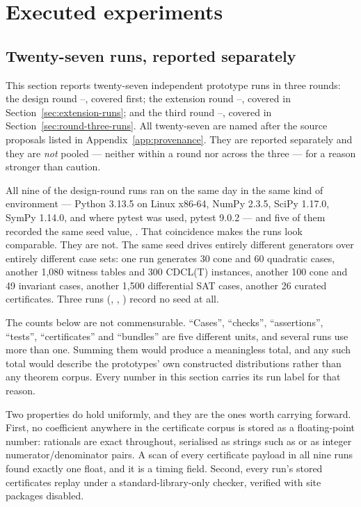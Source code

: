 \section{Executed experiments}
\label{sec:experiments}

\subsection{Twenty-seven runs, reported separately}

This section reports twenty-seven independent prototype runs in three rounds:
the design round --, covered first; the extension round
--, covered in Section~\ref{sec:extension-runs}; and the
third round --, covered in
Section~\ref{sec:round-three-runs}. All twenty-seven are named after the
source proposals listed in Appendix~\ref{app:provenance}. They are reported
separately and they are \emph{not} pooled --- neither within a round nor
across the three --- for a reason stronger than caution.

All nine of the design-round runs ran on the same day in the same kind of
environment --- Python 3.13.5
on Linux x86-64, NumPy 2.3.5, SciPy 1.17.0, SymPy 1.14.0, and where pytest was
used, pytest 9.0.2 --- and five of them recorded the same seed value,
. That coincidence makes the runs look comparable. They are not.
The same seed drives entirely different generators over entirely different case
sets: one run generates 30 cone and 60 quadratic cases, another 1{,}080 witness
tables and 300 CDCL(T) instances, another 100 cone and 49 invariant cases,
another 1{,}500 differential SAT cases, another 26 curated certificates. Three
runs (, , ) record no seed at all.

\begin{remark}
The counts below are not commensurable. ``Cases'', ``checks'', ``assertions'',
``tests'', ``certificates'' and ``bundles'' are five different units, and several
runs use more than one. Summing them would produce a meaningless total, and any
such total would describe the prototypes' own constructed distributions rather
than any theorem corpus. Every number in this section carries its run label for
that reason.
\end{remark}

Two properties do hold uniformly, and they are the ones worth carrying forward.
First, no coefficient anywhere in the certificate corpus is stored as a
floating-point number: rationals are exact throughout, serialised as strings
such as  or as integer numerator/denominator pairs. A scan of
every certificate payload in all nine runs found exactly one float, and it is a
timing field. Second, every run's stored certificates replay under a
standard-library-only checker, verified with site packages disabled.

